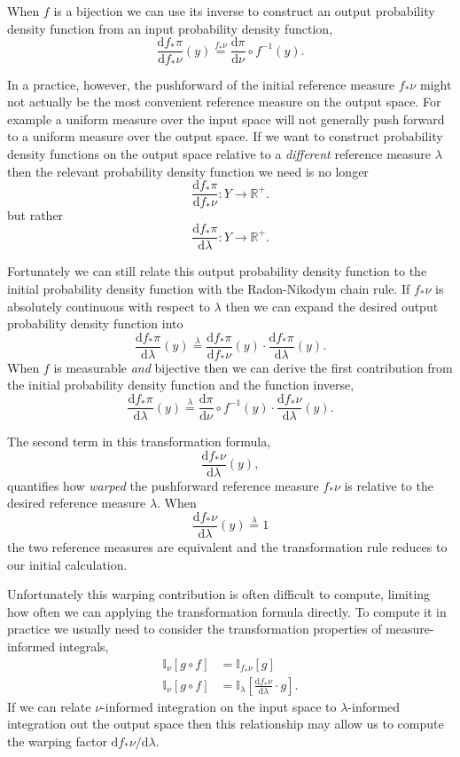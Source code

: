 \documentclass[
  letterpaper,
  DIV=11,
  numbers=noendperiod]{scrartcl}
\begin{document}
When \(f\) is a bijection we can use its inverse to construct an output
probability density function from an input probability density function,
\[
\frac{ \mathrm{d} f_{*} \pi }{ \mathrm{d} f_{*} \nu}(y)
\overset{f_{*} \nu}{=}
\frac{ \mathrm{d} \pi }{ \mathrm{d} \nu} \circ f^{-1}(y).
\]

In a practice, however, the pushforward of the initial reference measure
\(f_{*} \nu\) might not actually be the most convenient reference
measure on the output space. For example a uniform measure over the
input space will not generally push forward to a uniform measure over
the output space. If we want to construct probability density functions
on the output space relative to a \emph{different} reference measure
\(\lambda\) then the relevant probability density function we need is no
longer \[
\frac{ \mathrm{d} f_{*} \pi }{ \mathrm{d} f_{*} \nu} :
Y \rightarrow \mathbb{R}^{+}.
\] but rather \[
\frac{ \mathrm{d} f_{*} \pi }{ \mathrm{d} \lambda} :
Y \rightarrow \mathbb{R}^{+}.
\]

Fortunately we can still relate this output probability density function
to the initial probability density function with the Radon-Nikodym chain
rule. If \(f_{*} \nu\) is absolutely continuous with respect to
\(\lambda\) then we can expand the desired output probability density
function into \[
\frac{ \mathrm{d} f_{*} \pi }{ \mathrm{d} \lambda}(y)
\overset{\lambda}{=}
\frac{ \mathrm{d} f_{*} \pi }{ \mathrm{d} f_{*} \nu}(y)
\cdot
\frac{ \mathrm{d} f_{*} \pi }{ \mathrm{d} \lambda}(y).
\] When \(f\) is measurable \emph{and} bijective then we can derive the
first contribution from the initial probability density function and the
function inverse, \[
\frac{ \mathrm{d} f_{*} \pi }{ \mathrm{d} \lambda}(y)
\overset{\lambda}{=}
\frac{ \mathrm{d} \pi }{ \mathrm{d} \nu} \circ f^{-1}(y)
\cdot
\frac{ \mathrm{d} f_{*} \nu }{ \mathrm{d} \lambda}(y).
\]

The second term in this transformation formula, \[
\frac{ \mathrm{d} f_{*} \nu }{ \mathrm{d} \lambda}(y),
\] quantifies how \emph{warped} the pushforward reference measure
\(f_{*} \nu\) is relative to the desired reference measure \(\lambda\).
When \[
\frac{ \mathrm{d} f_{*} \nu }{ \mathrm{d} \lambda}(y)
\overset{\lambda}{=} 1
\] the two reference measures are equivalent and the transformation rule
reduces to our initial calculation.

Unfortunately this warping contribution is often difficult to compute,
limiting how often we can applying the transformation formula directly.
To compute it in practice we usually need to consider the transformation
properties of measure-informed integrals, \begin{align*}
\mathbb{I}_{\nu}[g \circ f]
&=
\mathbb{I}_{f_{*} \nu}[g]
\\
\mathbb{I}_{\nu} [ g \circ f ]
&=
\mathbb{I}_{\lambda} \left[
\frac{ \mathrm{d} f_{*} \nu }{ \mathrm{d} \lambda} \cdot g
\right].
\end{align*} If we can relate \(\nu\)-informed integration on the input
space to \(\lambda\)-informed integration out the output space then this
relationship may allow us to compute the warping factor
\(\mathrm{d} f_{*} \nu / \mathrm{d} \lambda\).
\end{document}
